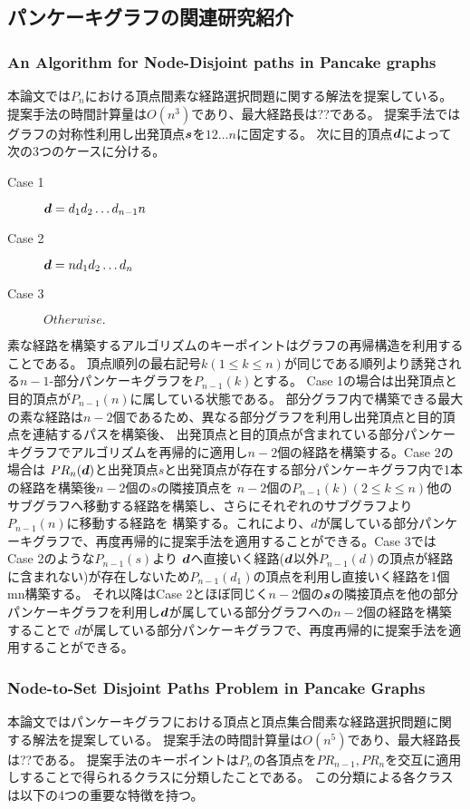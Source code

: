 \documentclass[11pt,a4j]{jsarticle}
\theoremstyle{plain}
\def\vector#1{\mbox{\boldmath $#1$}}
\begin{document}
\subsection{パンケーキグラフの関連研究紹介}
\subsubsection{An Algorithm for Node-Disjoint paths in Pancake graphs}
本論文\cite{pan-n2n}では$P_n$における頂点間素な経路選択問題に関する解法を提案している。
提案手法の時間計算量は$O(n^3)$であり、最大経路長は??である。
提案手法ではグラフの対称性利用し出発頂点${\vector s}$を$12\dots n$に固定する。
次に目的頂点$\vector{d}$によって次の3つのケースに分ける。
\begin{description}
 \item[Case 1] $\vector{d} = d_1d_2\dots d_{n-1}n$
 \item[Case 2]  $\vector{d} = nd_1d_2\dots d_{n}$
 \item[Case 3]  $Otherwise.$
\end{description}
素な経路を構築するアルゴリズムのキーポイントはグラフの再帰構造を利用することである。
頂点順列の最右記号$k( 1 \leq k \leq n )$が同じである順列より誘発される$n-1$-部分パンケーキグラフを$P_{n-1}(k)$とする。
Case 1の場合は出発頂点と目的頂点が$P_{n-1}(n)$に属している状態である。
部分グラフ内で構築できる最大の素な経路は$n-2$個であるため、異なる部分グラフを利用し出発頂点と目的頂点を連結するパスを構築後、
出発頂点と目的頂点が含まれている部分パンケーキグラフでアルゴリズムを再帰的に適用し$n-2$個の経路を構築する。Case 2の場合は
$PR_n(\vector{d})$と出発頂点\vector {s}と出発頂点が存在する部分パンケーキグラフ内で1本の経路を構築後$n-2$個の\vector{s}の隣接頂点を
$n-2$個の$P_{n-1}(k) (2 \leq k \le n)$他のサブグラフへ移動する経路を構築し、さらにそれぞれのサブグラフより$P_{n-1}(n)$に移動する経路を
構築する。これにより、\vector{d}が属している部分パンケーキグラフで、再度再帰的に提案手法を適用することができる。Case 3では Case 2のような$P_{n-1}(s)$より
$\vector{d}$へ直接いく経路($\vector{d}$以外$P_{n-1}(d)$の頂点が経路に含まれない)が存在しないため$P_{n-1}(d_1)$の頂点を利用し直接いく経路を1個mn構築する。
それ以降はCase 2とほぼ同じく$n-2$個の$\vector{s}$の隣接頂点を他の部分パンケーキグラフを利用し$\vector{d}$が属している部分グラフへの$n-2$個の経路を構築することで
\vector{d}が属している部分パンケーキグラフで、再度再帰的に提案手法を適用することができる。

\subsubsection{Node-to-Set Disjoint Paths Problem in Pancake Graphs}
本論文\cite{pan-n2s}ではパンケーキグラフにおける頂点と頂点集合間素な経路選択問題に関する解法を提案している。
提案手法の時間計算量は$O(n^5)$であり、最大経路長は??である。
提案手法のキーポイントは$P_n$の各頂点を$PR_{n-1},PR_{n}$を交互に適用しすることで得られるクラスに分類したことである。
この分類による各クラスは以下の4つの重要な特徴を持つ。
\end{document}
